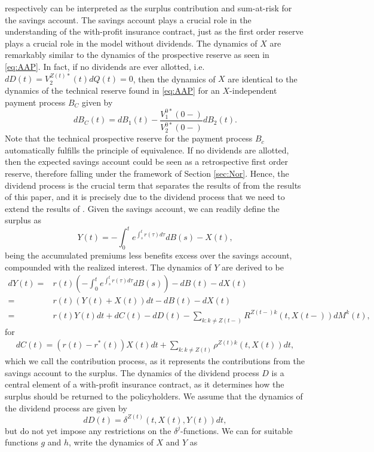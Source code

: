 \documentclass[12pt]{article}
\theoremstyle{my_thm}
\begin{document}
respectively can be interpreted as the surplus contribution and sum-at-risk for the savings account. The savings account plays a crucial role in the understanding of the with-profit insurance contract, just as the first order reserve plays a crucial role in the model without dividends. The dynamics of $X$ are remarkably similar to the dynamics of the prospective reserve as seen in \eqref{eq:AAP}. In fact, if no dividends are ever allotted, i.e. $dD(t)=V_2^{Z(t)*}(t)dQ(t)=0$, then the dynamics of $X$ are identical to the dynamics of the technical reserve found in \eqref{eq:AAP} for an $X$-independent payment process $B_C$ given  by
$$
dB_C(t)=dB_1(t)-\frac{V_1^{0*}(0-)}{V_2^{0*}(0-)}dB_2(t).
$$
Note that the technical prospective reserve for the payment process $B_c$ automatically fulfills the principle of equivalence. If no dividends are allotted, then the expected savings account could be seen as a retrospective first order reserve, therefore falling under the framework of Section \ref{sec:Nor}. Hence, the dividend process is the crucial term that separates the results of \citet{Norberg} from the results of this paper, and it is precisely due to the dividend process that we need to extend the results of \citet{Norberg}. Given the savings account, we can readily define the surplus as
$$
Y(t)= - \int_0^t e^{\int_s^t r(\tau) d\tau} dB(s)-X(t),
$$
being the accumulated premiums less benefits excess over the savings account, compounded with the realized interest. The dynamics of $Y$ are derived to be
\begin{align}
dY(t)=&
 r(t) \left( -\int_0^t e^{\int_s^t r(\tau) d\tau} dB(s) \right) - dB(t) -dX(t) \nonumber
\\
=&
r(t) \left(Y(t) + X(t) \right)dt - dB(t) -dX(t) \nonumber \\
=& r(t) Y(t) dt + dC(t)-dD(t)-
\sum_{k:k \neq Z(t-)}  R^{Z(t-)k}(t,X(t-)) dM^k(t), \label{eq:AAC}
\end{align}
for 
\begin{gather*}
dC(t)=(r(t)-r^*(t))X(t)dt+\sum_{k:k\neq Z(t)} \rho^{Z(t)k}(t,X(t)) dt,
\end{gather*}
which we call the contribution process, as it represents the contributions from the savings account to the surplus. The dynamics of the dividend process $D$ is a central element of a with-profit insurance contract, as it determines how the surplus should be returned to the policyholders. We assume that the dynamics of the dividend process are given by
$$
dD(t)=\delta^{Z(t)}(t,X(t),Y(t)) dt,
$$
but do not yet impose any restrictions on the $\delta^j$-functions. We can for suitable functions $g$ and $h$, write the dynamics of $X$ and $Y$ as
\end{document}
